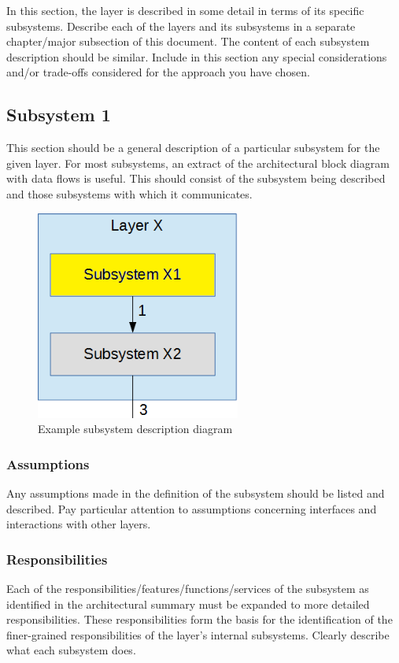 In this section, the layer is described in some detail in terms of its specific subsystems. Describe each of the layers and its subsystems in a separate chapter/major subsection of this document. The content of each subsystem description should be similar. Include in this section any special considerations and/or trade-offs considered for the approach you have chosen.

\subsection{Subsystem 1}
This section should be a general description of a particular subsystem for the given layer. For most subsystems, an extract of the architectural block diagram with data flows is useful. This should consist of the subsystem being described and those subsystems with which it communicates.

\begin{figure}[h!]
    \centering
    \includegraphics[width=0.60\textwidth]{images/subsystem}
    \caption{Example subsystem description diagram}
\end{figure}

\subsubsection{Assumptions}
Any assumptions made in the definition of the subsystem should be listed and described. Pay particular attention to assumptions concerning interfaces and interactions with other layers.

\subsubsection{Responsibilities}
Each of the responsibilities/features/functions/services of the subsystem as identified in the architectural summary must be expanded to more detailed responsibilities. These responsibilities form the basis for the identification of the finer-grained responsibilities of the layer's internal subsystems. Clearly describe what each subsystem does.


